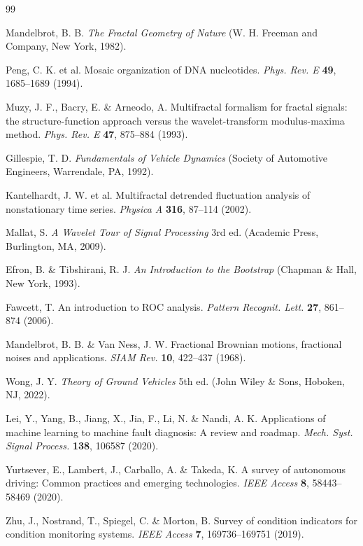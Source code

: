 \documentclass[11pt]{article}
\begin{document}
\begin{thebibliography}{99}

Mandelbrot, B. B. \textit{The Fractal Geometry of Nature} (W. H. Freeman and Company, New York, 1982).

Peng, C. K. et al. Mosaic organization of DNA nucleotides. \textit{Phys. Rev. E} \textbf{49}, 1685--1689 (1994).

Muzy, J. F., Bacry, E. \& Arneodo, A. Multifractal formalism for fractal signals: the structure-function approach versus the wavelet-transform modulus-maxima method. \textit{Phys. Rev. E} \textbf{47}, 875--884 (1993).

Gillespie, T. D. \textit{Fundamentals of Vehicle Dynamics} (Society of Automotive Engineers, Warrendale, PA, 1992).

Kantelhardt, J. W. et al. Multifractal detrended fluctuation analysis of nonstationary time series. \textit{Physica A} \textbf{316}, 87--114 (2002).

Mallat, S. \textit{A Wavelet Tour of Signal Processing} 3rd ed. (Academic Press, Burlington, MA, 2009).

Efron, B. \& Tibshirani, R. J. \textit{An Introduction to the Bootstrap} (Chapman \& Hall, New York, 1993).

Fawcett, T. An introduction to ROC analysis. \textit{Pattern Recognit. Lett.} \textbf{27}, 861--874 (2006).

Mandelbrot, B. B. \& Van Ness, J. W. Fractional Brownian motions, fractional noises and applications. \textit{SIAM Rev.} \textbf{10}, 422--437 (1968).

Wong, J. Y. \textit{Theory of Ground Vehicles} 5th ed. (John Wiley \& Sons, Hoboken, NJ, 2022).

Lei, Y., Yang, B., Jiang, X., Jia, F., Li, N. \& Nandi, A. K. Applications of machine learning to machine fault diagnosis: A review and roadmap. \textit{Mech. Syst. Signal Process.} \textbf{138}, 106587 (2020).

Yurtsever, E., Lambert, J., Carballo, A. \& Takeda, K. A survey of autonomous driving: Common practices and emerging technologies. \textit{IEEE Access} \textbf{8}, 58443--58469 (2020).

Zhu, J., Nostrand, T., Spiegel, C. \& Morton, B. Survey of condition indicators for condition monitoring systems. \textit{IEEE Access} \textbf{7}, 169736--169751 (2019).


\end{thebibliography}
\end{document}
